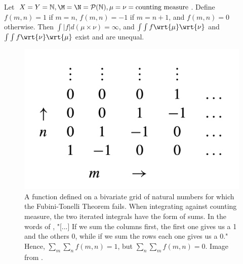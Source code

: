 \documentclass{article} %
\begin{document}
\begin{example}{}
\cite[Exercise 2.48, pp.69]{folland1999real} Let $X=Y=\mathbb{N}, \M =\N = \mathcal{P}(\mathbb{N}), \mu = \nu = \text{counting measure}$.  Define $f(m,n)=1$ if $m=n$, $f(m,n)=-1$ if $m=n+1$, and $f(m,n)=0$ otherwise.  Then $\int |f| d(\mu \times \nu) = \infty$, and $\int \int f \wrt{\mu} \wrt{\nu}$ and $\int \int f \wrt{\nu} \wrt{\mu} $ exist and are unequal. 

\begin{figure}[H]
\centering 
\includegraphics[width=.4\textwidth]{images/durretts_function_on_a_grid_of_natural_numbers_for_which_fubini_tonelli_fails}	
\caption{A function defined on a bivariate grid of natural numbers for which the Fubini-Tonelli Theorem fails.  When integrating against counting measure, the two iterated integrals have the form of sums. In the words of \cite{durrett2010probability}, "[...] If we sum the columns first, the first one gives us a 1 and the others 0, while if we sum the rows each one gives us a 0." Hence,  $\sum_m \sum_n f(m,n) = 1$, but  $\sum_n \sum_m f(m,n) = 0.$  Image from \cite{durrett2010probability}.}
\label{fig:durretts_function_on_a_grid_of_natural_numbers_for_which_fubini_tonelli_fails}
\end{figure}
\label{ex:NAME_ME}
\end{example}
\end{document}
